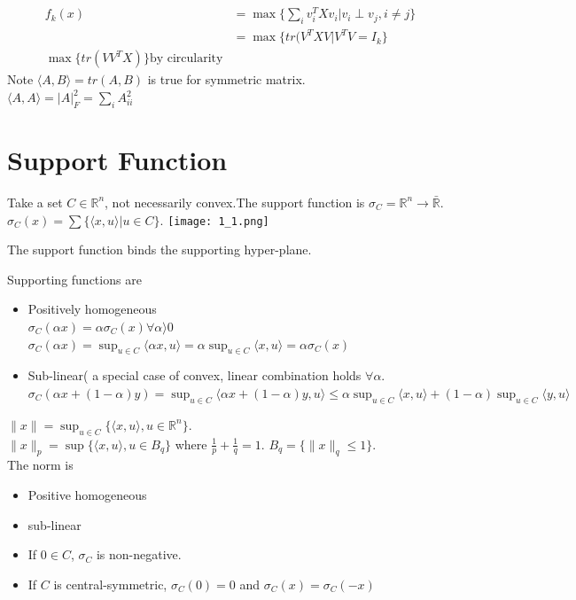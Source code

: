 \documentclass[11pt,fleqn]{book} %
\def\R{\mathbb{R}}
\begin{document}
\begin{example}
\begin{example}[Eigenvalues]
\begin{align*}
f_k(x) & = \max\{ \sum_{i} v_i^T Xv_i | v_i \perp v_j , i \neq j\} \\
& =  \max\{ tr( V^TXV | V^T V = I_k \} \\
\max \{tr(VV^TX) \} \text{by circularity}
\end{align*}
Note $\langle A,B\rangle  = tr(A,B)$ is true for symmetric matrix. \\
$\langle A,A\rangle  = |A |_F^2 = \sum_{i} A_{ii}^2$
\end{example}

\section{Support Function}
Take a set $C \in \R^n$, not necessarily convex.The support function is $\sigma_C = \R^n \to \bar{\R}$. $\sigma_C(x) = \sum \{ \langle x,u\rangle  | u \in C\}$.
\texttt{[image: 1\_1.png]}
\begin{fact}
The support function binds the supporting hyper-plane.
\end{fact}

Supporting functions are
\begin{itemize}
\item Positively homogeneous\\
$\sigma_C(\alpha x) = \alpha \sigma_C(x) \forall \alpha \rangle  0$ \\
$\sigma_C(\alpha x ) = \sup_{u \in C} \langle \alpha x, u\rangle  = \alpha \sup_{u \in C} \langle x, u\rangle  = \alpha \sigma_C(x)$
\item Sub-linear( a special case of convex, linear combination holds $\forall \alpha$.\\
$\sigma_C(\alpha x + (1 - \alpha) y ) = \sup_{u \in C} \langle \alpha x + (1 - \alpha) y,u\rangle  \le \alpha\sup_{u \in C}\langle x,u\rangle  + (1 - \alpha)\sup_{u \in C}\langle y,u\rangle  $
\end{itemize}
\begin{example}[L2-norm]
$\| x \| = \sup_{u \in C} \{ \langle x, u \rangle, u \in \R^n \}$.\\
$\|x \|_p = \sup \{ \langle x, u \rangle, u \in B_q \}$ where $\frac{1}{p} + \frac{1}{q} = 1$. $B_q = \{ \|x \|_q \le 1\}$.\\
The norm is
\begin{itemize}
\item Positive homogeneous
\item sub-linear
\item If $0 \in C$, $\sigma_C$ is non-negative.
\item If $C$ is central-symmetric, $\sigma_C(0) = 0$ and $\sigma_C(x) = \sigma_C(-x)$
\end{itemize}
\end{example}


\end{example}
\end{document}
